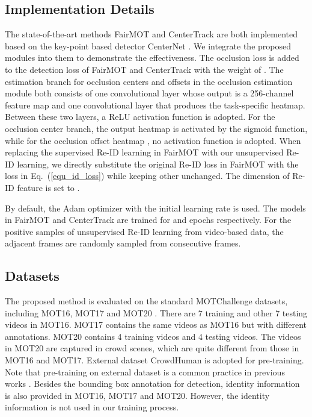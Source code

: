 \documentclass[final,1p,times,twocolumn]{elsarticle}
\newcommand{\eref}[1]{Eq.~(\ref{#1})}
\begin{document}
	\subsection{Implementation Details}
	The state-of-the-art methods FairMOT \cite{zhang2020fairmot} and CenterTrack \cite{zhou2020tracking} are both implemented based on the key-point based detector CenterNet \cite{zhou2019objects}. We integrate the proposed modules into them to demonstrate the effectiveness. The occlusion loss  is added to the detection loss of FairMOT and CenterTrack with the weight of . The estimation branch for occlusion centers and offsets in the occlusion estimation module both consists of one  convolutional layer whose output is a 256-channel feature map and one  convolutional layer that produces the task-specific heatmap. Between these two layers, a ReLU activation function is adopted. For the occlusion center branch, the output heatmap  is activated by the sigmoid function, while for the occlusion offset heatmap , no activation function is adopted. When replacing the supervised Re-ID learning in FairMOT \cite{zhang2020fairmot} with our unsupervised Re-ID learning, we directly substitute the original Re-ID loss in FairMOT with the loss  in \eref{equ_id_loss} while keeping other unchanged. The dimension  of Re-ID feature is set to .
	
	By default, the Adam optimizer \cite{kingma2014adam} with the initial learning rate  is used. The models in FairMOT and CenterTrack are trained for  and  epochs respectively. For the positive samples of unsupervised Re-ID learning from video-based data, the adjacent frames are randomly sampled from consecutive  frames.
	
	\subsection{Datasets}
	The proposed method is evaluated on the standard MOTChallenge datasets, including MOT16, MOT17 \cite{milan2016mot16} and MOT20 \cite{dendorfer2020mot20}.
	There are 7 training and other 7 testing videos in MOT16. MOT17 contains the same videos as MOT16 but with different annotations. MOT20 contains 4 training videos and 4 testing videos. The videos in MOT20 are captured in crowd scenes, which are quite different from those in MOT16 and MOT17. External dataset CrowdHuman \cite{shao2018crowdhuman} is adopted for pre-training. Note that pre-training on external dataset is a common practice in previous works
	\cite{sadeghian2017tracking, zhang2020fairmot, wang2019towards, wang2021multiple, zheng2021improving}. Besides the bounding box annotation for detection, identity information is also provided in MOT16, MOT17 and MOT20. However, the identity information is not used in our training process.
	
\end{document}
